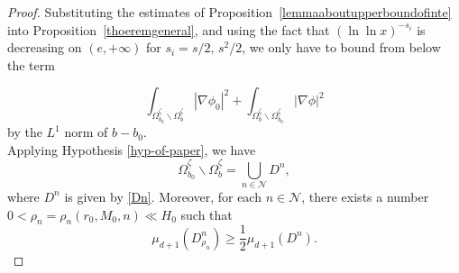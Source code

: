 \documentclass[11pt]{article}
\begin{document}
\begin{proof}
	Substituting the estimates of Proposition~\ref{lemmaaboutupperboundofinte} into Proposition~\ref{thoeremgeneral}, and using the fact that $(\ln\!\ln x)^{-s_i}$ is decreasing on $(e,+\infty)$ for $s_i=s/2,\,s^2/2$, 
	 we only have to bound from below the term
	
	$$\displaystyle\int_{\Omega_{b_0}^{\underline{\zeta}}\backslash \Omega_{b}^{\underline{\zeta}}}\left|\nabla\phi_0\right|^2+\displaystyle\int_{\Omega_{b}^{\underline{\zeta}}\backslash \Omega_{b_0}^{\underline{\zeta}}}\left|\nabla\phi\right|^2$$
	by the $L^1$ norm of $b-b_0$.\\
	Applying Hypothesis \ref{hyp-of-paper}, we have 
    $$\Omega_{b_0}^{\underline{\zeta}}\backslash \Omega_{b}^{\underline{\zeta}}=\bigcup_{n\in \mathcal N}D^n,$$
    where $D^n$ is given by \eqref{Dn}. Moreover, for each $n\in  \mathcal N $, there exists a number $0<\rho_n=\rho_n(r_0,M_0,n)  \ll H_0$ such that 
	\begin{equation}\label{fatnessn}
		\mu_{d+1} (D^n_{\rho_n})\geq\frac{1}{2}\mu_{d+1} (D^n).
	\end{equation}
	

\end{proof}
\end{document}
